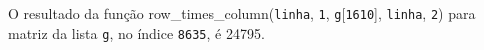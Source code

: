 \documentclass[12pt,varwidth=16cm,border=1pt]{standalone}
\begin{document}
O resultado da função row\_times\_column(\verb+linha+, \verb+1+, \verb+g+[\verb+1610+], \verb+linha+, \verb+2+) para matriz da lista \verb+g+, no índice \verb+8635+, é 24795.

\questiomfalse
\end{document}
